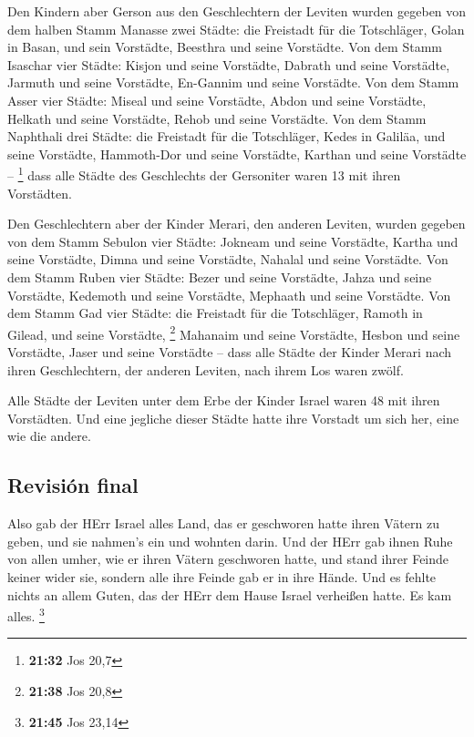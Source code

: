  Den Kindern aber Gerson aus den Geschlechtern der
Leviten wurden gegeben von dem halben Stamm Manasse zwei Städte: die
Freistadt für die Totschläger, Golan in Basan, und sein Vorstädte,
Beesthra und seine Vorstädte.  Von dem Stamm Isaschar
vier Städte: Kisjon und seine Vorstädte, Dabrath und seine Vorstädte,
 Jarmuth und seine Vorstädte, En-Gannim und seine
Vorstädte.  Von dem Stamm Asser vier Städte: Miseal und
seine Vorstädte, Abdon und seine Vorstädte,  Helkath und
seine Vorstädte, Rehob und seine Vorstädte.  Von dem
Stamm Naphthali drei Städte: die Freistadt für die Totschläger, Kedes in
Galiläa, und seine Vorstädte, Hammoth-Dor und seine Vorstädte, Karthan
und seine Vorstädte -- \footnote{\textbf{21:32} Jos 20,7}
 dass alle Städte des Geschlechts der Gersoniter waren 13
mit ihren Vorstädten.

 Den Geschlechtern aber der Kinder Merari, den anderen
Leviten, wurden gegeben von dem Stamm Sebulon vier Städte: Jokneam und
seine Vorstädte, Kartha und seine Vorstädte,  Dimna und
seine Vorstädte, Nahalal und seine Vorstädte.  Von dem
Stamm Ruben vier Städte: Bezer und seine Vorstädte, Jahza und seine
Vorstädte,  Kedemoth und seine Vorstädte, Mephaath und
seine Vorstädte.  Von dem Stamm Gad vier Städte: die
Freistadt für die Totschläger, Ramoth in Gilead, und seine Vorstädte,
\footnote{\textbf{21:38} Jos 20,8}  Mahanaim und seine
Vorstädte, Hesbon und seine Vorstädte, Jaser und seine Vorstädte --
 dass alle Städte der Kinder Merari nach ihren
Geschlechtern, der anderen Leviten, nach ihrem Los waren zwölf.

 Alle Städte der Leviten unter dem Erbe der Kinder Israel
waren 48 mit ihren Vorstädten.  Und eine jegliche dieser
Städte hatte ihre Vorstadt um sich her, eine wie die andere.

\hypertarget{revisiuxf3n-final}{%
\subsection{Revisión final}\label{revisiuxf3n-final}}

 Also gab der HErr Israel alles Land, das er geschworen
hatte ihren Vätern zu geben, und sie nahmen's ein und wohnten darin.
 Und der HErr gab ihnen Ruhe von allen umher, wie er
ihren Vätern geschworen hatte, und stand ihrer Feinde keiner wider sie,
sondern alle ihre Feinde gab er in ihre Hände.  Und es
fehlte nichts an allem Guten, das der HErr dem Hause Israel verheißen
hatte. Es kam alles. \footnote{\textbf{21:45} Jos 23,14}


